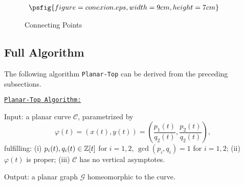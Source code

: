 \documentclass{elsart}
\begin{document}
\begin{figure}[ht]
\begin{center}
\centerline{$\begin{array}{ccc}
\psfig{figure=conexion.eps,width=9cm,height=7cm}
\end{array}$}
\end{center}
\caption{Connecting Points}
\end{figure}














\subsection{Full Algorithm} \label{algorit-planar}

The following algorithm {\tt Planar-Top} can be derived from the preceding subsections.

\underline{\tt Planar-Top Algorithm:}

{\sf Input:}  a planar curve ${\mathcal C}$, parametrized by
\[\varphi(t)=(x(t),y(t))=\left(\displaystyle{\frac{p_1(t)}{q_2(t)}},\displaystyle{\frac{p_2(t)}{q_2(t)}}\right),\]
fulfilling: (i) $p_i(t),q_i(t)\in {\Bbb Z}[t]$ for $i=1,2$,
$\gcd(p_i,q_i)=1$ for $i=1,2$; (ii) $\varphi(t)$ is proper; (iii)
${\mathcal C}$ has no vertical asymptotes.

{\sf Output:} a planar graph ${\mathcal G}$ homeomorphic to the
curve.
\end{document}
